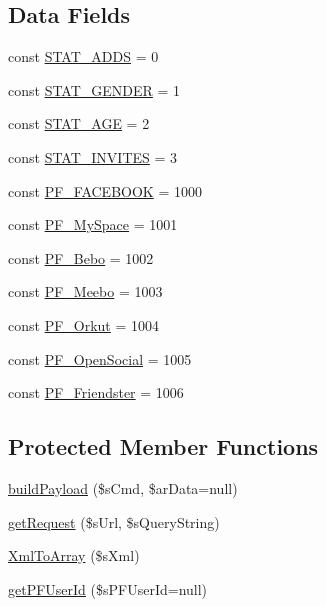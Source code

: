 \subsection*{Data Fields}
\begin{DoxyCompactItemize}
\item 
const \hyperlink{classSonetrixClient_a12804ac5dcb2455ae3119f387641f5aa}{STAT\_\-ADDS} = 0
\item 
const \hyperlink{classSonetrixClient_a09f6e412c2a4aafdd9e16c7bf9c4ec85}{STAT\_\-GENDER} = 1
\item 
const \hyperlink{classSonetrixClient_a06eba9e43261b72ca95f5030d3cae017}{STAT\_\-AGE} = 2
\item 
const \hyperlink{classSonetrixClient_aaa7126588b810c9b0d17b81922be0a88}{STAT\_\-INVITES} = 3
\item 
const \hyperlink{classSonetrixClient_a4ac3e460ee02ac10bfb658decf181af2}{PF\_\-FACEBOOK} = 1000
\item 
const \hyperlink{classSonetrixClient_a502e2dfe7e28c0a91549444f1f4a6abe}{PF\_\-MySpace} = 1001
\item 
const \hyperlink{classSonetrixClient_a0f114d21419d464659b0771683bec488}{PF\_\-Bebo} = 1002
\item 
const \hyperlink{classSonetrixClient_ad2891ce22c2e75ada4a612cf8fff5685}{PF\_\-Meebo} = 1003
\item 
const \hyperlink{classSonetrixClient_a6769a04dfc6dfa871e2649b8da5d2bc7}{PF\_\-Orkut} = 1004
\item 
const \hyperlink{classSonetrixClient_ad576cd314e932752cf96eae2c0c2e10c}{PF\_\-OpenSocial} = 1005
\item 
const \hyperlink{classSonetrixClient_a41bdcc39f5464386850c0a59e2e488da}{PF\_\-Friendster} = 1006
\end{DoxyCompactItemize}
\subsection*{Protected Member Functions}
\begin{DoxyCompactItemize}
\item 
\hyperlink{classSonetrixClient_ab858a44baaf36d886e558c7195563468}{buildPayload} (\$sCmd, \$arData=null)
\item 
\hyperlink{classSonetrixClient_a9e9f916c28233d549a4392952d872994}{getRequest} (\$sUrl, \$sQueryString)
\item 
\hyperlink{classSonetrixClient_a961a2f3e2349415890c493194472e6c9}{XmlToArray} (\$sXml)
\item 
\hyperlink{classSonetrixClient_a422ca92c2fe20490d9f70520061dbcd5}{getPFUserId} (\$sPFUserId=null)
\end{DoxyCompactItemize}
